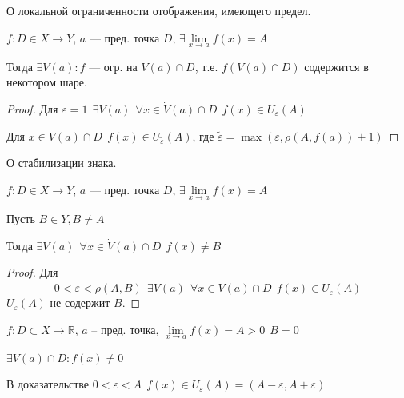 \begin{theorem}
    О локальной ограниченности отображения, имеющего предел.

    $f: D\in X\to Y$, $a$ --- пред. точка $D$, $\exists\lim\limits_{x\to a} f(x)=A$

    Тогда $\exists V(a) : f$ --- огр. на $V(a)\cap D$, т.е. $f(V(a)\cap D)$ содержится в некотором шаре.
\end{theorem}
\begin{proof}
    Для $\varepsilon = 1 \ \ \exists V(a) \ \ \forall x\in \dot V(a)\cap D \ \ f(x)\in U_\varepsilon(A)$

    Для $x\in V(a)\cap D \ \ f(x)\in U_{\tilde{\varepsilon}} (A)$, где $\tilde \varepsilon = \max(\varepsilon, \rho(A, f(a)) + 1)$
\end{proof}

\begin{theorem}
    О стабилизации знака.

    $f: D\in X\to Y$, $a$ --- пред. точка $D$, $\exists\lim\limits_{x\to a} f(x)=A$

    Пусть $B\in Y, B\not=A$

    Тогда $\exists V(a) \ \ \forall x \in \dot V(a)\cap D \ \ f(x)\not = B$
\end{theorem}
\begin{proof}
    Для $$0 < \varepsilon < \rho(A, B) \ \ \exists V(a) \ \ \forall x\in \dot V(a)\cap D \ \ f(x)\in U_\varepsilon(A)$$ $U_\varepsilon(A)$ не содержит $B$.
\end{proof}
\begin{consequence} 
    $f:D\subset X \to \mathbb{R}$, $a$ -- пред. точка, $\lim\limits_{x\to a} f(x)=A>0 \ \ B=0$

    $\exists \dot V(a)\cap D : f(x)\not=0$

    В доказательстве $0<\varepsilon<A \ \ f(x)\in U_\varepsilon (A)=(A-\varepsilon, A+\varepsilon)$
\end{consequence}

